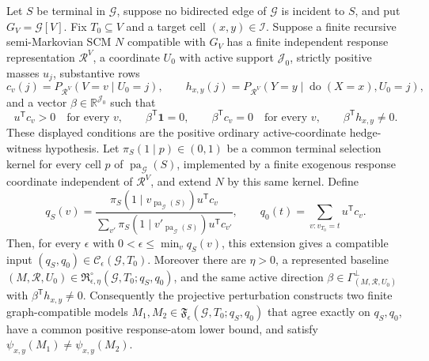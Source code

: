Let \(S\) be terminal in \(\mathcal G\), suppose no bidirected edge of \(\mathcal G\) is incident to \(S\), and put \(G_V=\mathcal G[V]\).  Fix \(T_0\subseteq V\) and a target cell \((x,y)\in\mathcal I\).  Suppose a finite recursive semi-Markovian SCM \(N\) compatible with \(G_V\) has a finite independent response representation \(\mathcal R^{V}\), a coordinate \(U_0\) with active support \(\mathcal J_0\), strictly positive masses \(u_j\), substantive rows
\[
 c_v(j)=P_{\mathcal R^{V}}(V=v\mid U_0=j),
 \qquad
 h_{x,y}(j)=P_{\mathcal R^{V}}(Y=y\mid\operatorname{do}(X=x),U_0=j),
\]
and a vector \(\beta\in\mathbb R^{\mathcal J_0}\) such that
\[
 u^{\mathsf T}c_v>0\quad\text{for every }v,\qquad
 \beta^{\mathsf T}\mathbf 1=0,\qquad
 \beta^{\mathsf T}c_v=0\quad\text{for every }v,\qquad
 \beta^{\mathsf T}h_{x,y}\neq0.
\]
These displayed conditions are the positive ordinary active-coordinate hedge-witness hypothesis.  Let \(\pi_S(1\mid p)\in(0,1)\) be a common terminal selection kernel for every cell \(p\) of \(\operatorname{pa}_{\mathcal G}(S)\), implemented by a finite exogenous response coordinate independent of \(\mathcal R^{V}\), and extend \(N\) by this same kernel.  Define
\[
 q_S(v)=
 \frac{\pi_S(1\mid v_{\operatorname{pa}_{\mathcal G}(S)})u^{\mathsf T}c_v}
 {\sum_{v'}\pi_S(1\mid v'_{\operatorname{pa}_{\mathcal G}(S)})u^{\mathsf T}c_{v'}},
 \qquad
 q_0(t)=\sum_{v:v_{T_0}=t}u^{\mathsf T}c_v.
\]
Then, for every \(\epsilon\) with \(0<\epsilon\leq\min_v q_S(v)\), this extension gives a compatible input \((q_S,q_0)\in\mathcal C_{\epsilon}(\mathcal G,T_0)\).  Moreover there are \(\eta>0\), a represented baseline \((M,\mathcal R,U_0)\in\mathfrak R_{\epsilon,\eta}^{\circ}(\mathcal G,T_0;q_S,q_0)\), and the same active direction \(\beta\in\Gamma_{(M,\mathcal R,U_0)}^{\perp}\) with \(\beta^{\mathsf T}h_{x,y}\neq0\).  Consequently the projective perturbation constructs two finite graph-compatible models \(M_1,M_2\in\mathfrak F_{\epsilon}(\mathcal G,T_0;q_S,q_0)\) that agree exactly on \(q_S,q_0\), have a common positive response-atom lower bound, and satisfy \(\psi_{x,y}(M_1)\neq\psi_{x,y}(M_2)\).